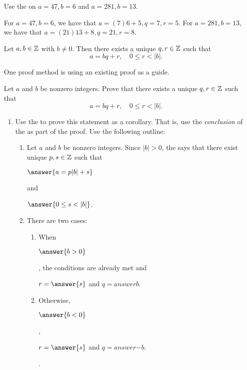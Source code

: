 \documentclass{../ximera}
\begin{document}
\begin{br}
 Use the  on $a=47, b=6$ and $a=281, b=13$.
\end{br}
\begin{solution}
For $a=47, b=6$, we have that $a=(7)6+5, q=7, r=5$.
For $a=281, b=13$, we have that $a=(21)13+8, q=21, r=8$.
\end{solution}

\begin{corollary}
 Let $a,b\in\mathbb Z$ with $b\neq0$. Then there exists a unique $q,r\in\mathbb Z$ such that \[a=bq+r, \quad 0\leq r <|b|.\]
\end{corollary}
One proof method is using an existing proof as a guide.

\begin{br} Let $a$ and $b$ be nonzero integers. Prove that there exists a unique $q,r\in\mathbb Z$ such that 
  \[a=bq+r, \quad 0\leq r <|b|.\]
  \begin{enumerate}
    	\item Use the  to prove this statement as a corollary. That is, use the \emph{conclusion} of the  as part of the proof.  Use the following outline:
    	\begin{enumerate}
		\item  Let $a$ and $b$ be nonzero integers. Since $|b|>0$, the  says that there exist unique $p,s\in\mathbb Z$ such that 
		\begin{prompt}
			$\answer{a=p|b|+s}$
		\end{prompt} and 
		\begin{prompt}
			$\answer{0\leq s<|b|}$.
		\end{prompt}
      		\item There are two cases:
      		\begin{enumerate}
        			\item When 
					\begin{prompt}
						$\answer{b>0}$
					\end{prompt}, the conditions are already met and 
					\begin{prompt}
						$r=\answer{s}$ and $q=answer{b}$.
					\end{prompt}
        			\item Otherwise, 
					\begin{prompt}
						$\answer{b<0}$
					\end{prompt}, \begin{prompt}
						$r=\answer{s}$ and $q=answer{-b}$.
					\end{prompt}.

\end{enumerate}
\end{enumerate}
\end{enumerate}
\end{br}
\end{document}
